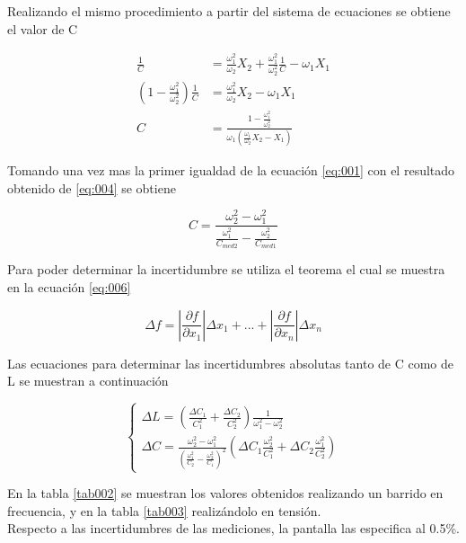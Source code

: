 \documentclass[a4paper,10pt]{article}
\begin{document}
		\indent Realizando el mismo procedimiento a partir del sistema de 
		ecuaciones se obtiene el valor de C

		\begin{align}\label{eq:004}
			\frac{1}{C} &= \frac{\omega_1^2}{\omega_2}X_2 + 
				\frac{\omega_1^2}{\omega_2^2}\frac{1}{C} - \omega_1X_1 \\
			(1 - \frac{\omega_1^2}{\omega_2^2})\frac{1}{C} &= 
			\frac{\omega_1^2}{\omega_2}X_2 - \omega_1X_1 \\
			C &= \frac{1 - \frac{\omega_1^2}{\omega_2^2}}
				{\omega_1(\frac{\omega_1}{\omega_2}X_2 - X_1)}
		\end{align}

		\indent Tomando una vez mas la primer igualdad de la ecuación 
		\ref{eq:001} con el resultado obtenido de \ref{eq:004} se obtiene

		\begin{equation}\label{eq:005}
			C = \frac{\omega_2^2 - \omega_1^2}
				{\frac{\omega_1^2}{C_{med2}} - \frac{\omega_2^2}{C_{med1}}}
		\end{equation}

		\indent Para poder determinar la incertidumbre se utiliza el teorema 
		el cual se muestra en la ecuación \ref{eq:006}

		\begin{equation}\label{eq:006}
			\Delta f = 	|\frac{\partial f}{\partial x_1}|\Delta x_1 + ... + 
						|\frac{\partial f}{\partial x_n}|\Delta x_n
		\end{equation}

		\indent Las ecuaciones para determinar las incertidumbres absolutas 
		tanto de C como de L se muestran a continuación

		\[
		\begin{cases} 
			\Delta L = (\frac{\Delta C_1}{C_1^2} + \frac{\Delta C_2}{C_2^2}) 
						\frac{1}{\omega_1^2 - \omega_2^2} \\ 
			\Delta C =  \frac{\omega_2^2 - \omega_1^2}{(\frac{\omega_1^2}{C_2} -
						\frac{\omega_2^2}{C_1})^2}(\Delta C_1\frac{\omega_2^2}
						{C_1^2} + \Delta C_2 \frac{\omega_1^2}{C_2^2})
		\end{cases}
		\]

		\indent En la tabla \ref{tab002} se muestran los valores obtenidos 
		realizando un barrido en frecuencia, y en la tabla \ref{tab003} 
		realizándolo en tensión. \\
		\indent Respecto a las incertidumbres de las mediciones, la pantalla las
		especifica al 0.5\%. 
\end{document}
